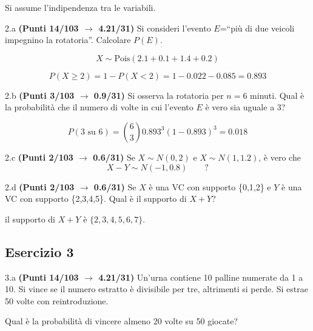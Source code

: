 \documentclass[
  11pt,
]{book}
\theoremstyle{mytheoremstyle}
\theoremstyle{mydefstyle}
\newenvironment{sol}
  {
  \begin{tcolorbox}[enhanced,breakable,arc=0.1mm,boxrule=1pt,colback=white,colframe=iblue,
  title=\bf \fontfamily{lmss}\selectfont \hspace{.5 cm} Soluzione,drop fuzzy shadow]

}{
\end{tcolorbox}
  }
\begin{document}
Si assume l'indipendenza tra le variabili.

2.a \textbf{(Punti 14/103 \(\rightarrow\) 4.21/31)} Si consideri l'evento \(E\)=``più di due veicoli impegnino la rotatoria''. Calcolare \(P(E)\).

\begin{sol}
\[
X\sim\text{Pois}(2.1+0.1+1.4+0.2)
\]

\[P(X\ge 2) = 1-P(X<2)=1-0.022-0.085= 0.893\]

\end{sol}

2.b \textbf{(Punti 3/103 \(\rightarrow\) 0.9/31)} Si osserva la rotatoria per \(n=6\) minuti. Qual è
la probabilità che il numero di volte in cui l'evento \(E\) è vero sia uguale a 3?

\begin{sol}
\[
P(\text{3 su 6})=\binom{6}{3}0.893^3(1-0.893)^3=0.018
\]

\end{sol}

2.c \textbf{(Punti 2/103 \(\rightarrow\) 0.6/31)} Se \(X\sim N(0,2)\) e \(X\sim N(1,1.2)\), è vero che
\[
X-Y\sim N(-1,0.8) \qquad ?
\]

2.d \textbf{(Punti 2/103 \(\rightarrow\) 0.6/31)} Se \(X\) è una VC con supporto \{0,1,2\} e \(Y\) è una VC con supporto \{2,3,4,5\}.
Qual è il supporto di \(X+Y\)?

\begin{sol}
il supporto di \(X+Y\) è \(\{2, 3, 4, 5, 6, 7\}\).

\end{sol}

\subsection{Esercizio 3}\label{esercizio-3-13}

3.a \textbf{(Punti 14/103 \(\rightarrow\) 4.21/31)} Un'urna contiene 10 palline numerate da 1 a 10.
Si vince se il numero estratto è divisibile per tre, altrimenti si perde.
Si estrae 50 volte con reintroduzione.

Qual è la probabilità di vincere almeno 20 volte su 50 giocate?
\end{document}
